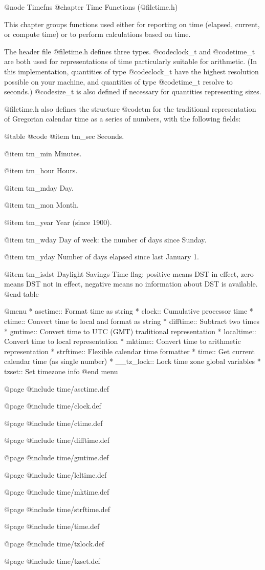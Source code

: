 @node Timefns
@chapter Time Functions (@file{time.h})

This chapter groups functions used either for reporting on time
(elapsed, current, or compute time) or to perform calculations based
on time.

The header file @file{time.h} defines three types.  @code{clock_t} and
@code{time_t} are both used for representations of time particularly
suitable for arithmetic.  (In this implementation, quantities of type
@code{clock_t} have the highest resolution possible on your machine,
and quantities of type @code{time_t} resolve to seconds.)  @code{size_t}
is also defined if necessary for quantities representing sizes. 

@file{time.h} also defines the structure @code{tm} for the traditional
representation of Gregorian calendar time as a series of numbers, with
the following fields: 

@table @code
@item tm_sec
Seconds.

@item tm_min
Minutes.

@item tm_hour
Hours.

@item tm_mday
Day.

@item tm_mon
Month.

@item tm_year
Year (since 1900).

@item tm_wday
Day of week: the number of days since Sunday.

@item tm_yday
Number of days elapsed since last January 1.

@item tm_isdst
Daylight Savings Time flag: positive means DST in effect, zero means DST
not in effect, negative means no information about DST is available.
@end table

@menu
* asctime::     Format time as string
* clock::       Cumulative processor time
* ctime::       Convert time to local and format as string
* difftime::    Subtract two times
* gmtime::      Convert time to UTC (GMT) traditional representation
* localtime::   Convert time to local representation
* mktime::      Convert time to arithmetic representation
* strftime::    Flexible calendar time formatter
* time::        Get current calendar time (as single number)
* __tz_lock::   Lock time zone global variables
* tzset::       Set timezone info
@end menu

@page
@include time/asctime.def

@page
@include time/clock.def

@page
@include time/ctime.def

@page
@include time/difftime.def

@page
@include time/gmtime.def

@page
@include time/lcltime.def

@page
@include time/mktime.def

@page
@include time/strftime.def

@page
@include time/time.def

@page
@include time/tzlock.def

@page
@include time/tzset.def
